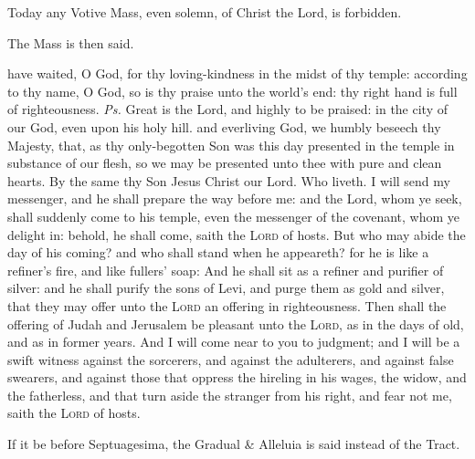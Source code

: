\begin{rubric}
    Today any Votive Mass, even solemn, of Christ the Lord, is forbidden.
\end{rubric}
\begin{rubric}
    The Mass is then said.
\end{rubric}
\introit
{} have waited, O God, for thy loving-kindness in the midst of thy temple: according to thy name, O God, so is thy praise unto the world's end: thy right hand is full of righteousness. \textit{Ps.} Great is the Lord, and highly to be praised: in the city of our God, even upon his holy hill.
\collect
{} and everliving God, we humbly beseech thy Majesty, that, as thy only-begotten Son was this day presented in the temple in substance of our flesh, so we may be presented unto thee with pure and clean hearts. By the same thy Son Jesus Christ our Lord. Who liveth.
 I will send my messenger, and he shall prepare the way before me: and the Lord, whom ye seek, shall suddenly come to his temple, even the messenger of the covenant, whom ye delight in: behold, he shall come, saith the \textsc{Lord} of hosts. But who may abide the day of his coming? and who shall stand when he appeareth? for he is like a refiner's fire, and like fullers' soap: And he shall sit as a refiner and purifier of silver: and he shall purify the sons of Levi, and purge them as gold and silver, that they may offer unto the \textsc{Lord} an offering in righteousness. Then shall the offering of Judah and Jerusalem be pleasant unto the \textsc{Lord}, as in the days of old, and as in former years. And I will come near to you to judgment; and I will be a swift witness against the sorcerers, and against the adulterers, and against false swearers, and against those that oppress the hireling in his wages, the widow, and the fatherless, and that turn aside the stranger from his right, and fear not me, saith the \textsc{Lord} of hosts.


\begin{rubric}
    If it be before Septuagesima, the Gradual \& Alleluia is said instead of the Tract.
\end{rubric}


